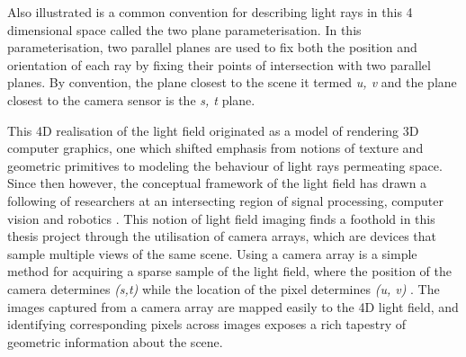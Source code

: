 \documentclass[openany]{book}
\begin{document}
Also illustrated is a common convention for describing light rays in this 4 dimensional space called the two plane parameterisation. In this parameterisation, two parallel planes are used to fix both the position and orientation of each ray by fixing their points of intersection with two parallel planes. By convention, the plane closest to the scene it termed \textit{u, v} and the plane closest to the camera sensor is the \textit{s, t} plane.

This 4D realisation of the light field originated as a model of rendering 3D computer graphics, one which shifted emphasis from notions of texture and geometric primitives to modeling the behaviour of light rays permeating space. Since then however, the conceptual framework of the light field has drawn a following of researchers at an intersecting region of signal processing, computer vision and robotics \cite{dansereau2014phd}. This notion of light field imaging finds a foothold in this thesis project through the utilisation of camera arrays, which are devices that sample multiple views of the same scene. Using a camera array is a simple method for acquiring a sparse sample of the light field, where the position of the camera determines \textit{(s,t)} while the location of the pixel determines \textit{(u, v)} \cite{yao2016camarray}. The images captured from a camera array are mapped easily to the 4D light field, and identifying corresponding pixels across images exposes a rich tapestry of geometric information about the scene. 
\end{document}
